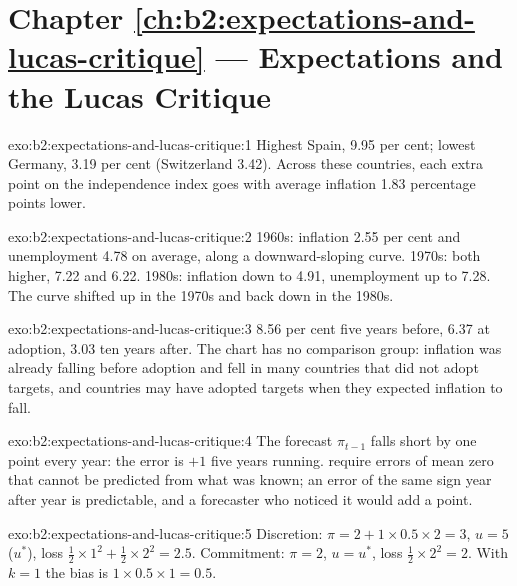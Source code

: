 \section*{Chapter \ref{ch:b2:expectations-and-lucas-critique} --- Expectations and the Lucas Critique}

\begin{solution}{exo:b2:expectations-and-lucas-critique:1}
Highest Spain, 9.95 per cent; lowest Germany, 3.19 per cent (Switzerland 3.42). Across these countries, each extra point on the
independence index goes with average inflation 1.83 percentage points lower.
\end{solution}

\begin{solution}{exo:b2:expectations-and-lucas-critique:2}
1960s: inflation 2.55 per cent and unemployment 4.78 on average, along a downward-sloping curve. 1970s: both higher, 7.22 and 6.22.
1980s: inflation down to 4.91, unemployment up to 7.28. The curve shifted up in the 1970s and back down in the 1980s.
\end{solution}

\begin{solution}{exo:b2:expectations-and-lucas-critique:3}
8.56 per cent five years before, 6.37 at adoption, 3.03 ten years after. The chart has no comparison group: inflation was
already falling before adoption and fell in many countries that did not adopt targets, and countries may have adopted
targets when they expected inflation to fall.
\end{solution}

\begin{solution}{exo:b2:expectations-and-lucas-critique:4}
The forecast $\pi_{t-1}$ falls short by one point every year: the error is $+1$ five years running.  require
errors of mean zero that cannot be predicted from what was known; an error of the same sign year after year is
predictable, and a forecaster who noticed it would add a point.
\end{solution}

\begin{solution}{exo:b2:expectations-and-lucas-critique:5}
Discretion: $\pi = 2 + 1 \times 0.5 \times 2 = 3$, $u = 5$ ($u^*$), loss $\tfrac12 \times 1^2 + \tfrac12 \times 2^2 = 2.5$. Commitment: $\pi = 2$, $u = u^*$, loss $\tfrac12 \times 2^2 = 2$. With $k = 1$ the bias is $1 \times 0.5 \times 1 = 0.5$.
\end{solution}


